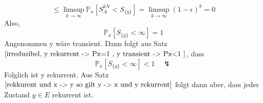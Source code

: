 \begin{itemize}
\begin{equation*}
\leq \limsup_{k \to \infty} \mathbb{P}_{x}[S_{A}^{kN} < S_{\lbrace y \rbrace}] = \limsup_{k \to \infty} (1 - \epsilon)^{k} = 0
\end{equation*}
Also,
\begin{equation*}
\mathbb{P}_{x}[S_{\lbrace y \rbrace} < \infty] = 1
\end{equation*}
Angenommen y wäre transient. Dann folgt aus Satz $\ref{irreduzibel, y rekurrent -> Px=1 , y transient -> Px<1 }$, dass
\begin{equation*}
\mathbb{P}_{x}[S_{\lbrace y \rbrace} < \infty] < 1 \quad \lightning
\end{equation*}
Folglich ist y rekurrent. Aus Satz $\ref{rekkurent und x -> y so gilt y -> x und y rekurrent}$ folgt dann aber, dass jeder Zustand $y \in E$ rekurrent ist.
\end{itemize}